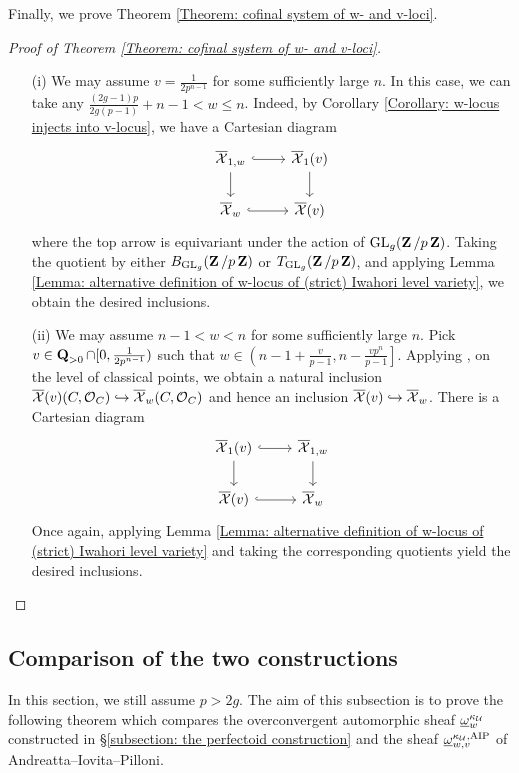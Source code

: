 Finally, we prove Theorem \ref{Theorem: cofinal system of w- and v-loci}.

\begin{proof}[Proof of Theorem \ref{Theorem: cofinal system of w- and v-loci}] 
\begin{enumerate}
    \item[(i)] We may assume $v=\frac{1}{2p^{n-1}}$ for some sufficiently large $n$. In this case, we can take any $\frac{(2g-1)p}{2g(p-1)}+n-1 < w \leq n$. Indeed, by Corollary \ref{Corollary: w-locus injects into v-locus}, we have a Cartesian diagram
     \[
        \begin{tikzcd}
            \overline{\calX}_{1, w}\arrow[r, hook]\arrow[d] & \overline{\calX}_1(v)\arrow[d]\\
        \overline{\calX}_{w}\arrow[r, hook] & \overline{\calX}(v)
        \end{tikzcd}
    \]
    where the top arrow is equivariant under the action of $\operatorname{GL}_g(\operatorname{\mathbf{Z}}/p\operatorname{\mathbf{Z}})$. Taking the quotient by either $B_{\operatorname{GL}_g}(\operatorname{\mathbf{Z}}/p\operatorname{\mathbf{Z}})$ or $T_{\operatorname{GL}_g}(\operatorname{\mathbf{Z}}/p\operatorname{\mathbf{Z}})$, and applying Lemma \ref{Lemma: alternative definition of w-locus of (strict) Iwahori level variety}, we obtain the desired inclusions.
        
    \item[(ii)] We may assume $n-1<w<n$ for some sufficiently large $n$. Pick $v\in \operatorname{\mathbf{Q}}_{>0}\cap [0, \frac{1}{2p^{n-1}})$ such that $w\in \left(n-1+\frac{v}{p-1}, n-\frac{vp^n}{p-1}\right]$. Applying \cite[Proposition 3.2.1]{AIP-2015}, on the level of classical points, we obtain a natural inclusion $\overline{\operatorname{\mathcal{X}}}(v)(C, \operatorname{\mathcal{O}}_C) \hookrightarrow \overline{\operatorname{\mathcal{X}}}_w(C,\operatorname{\mathcal{O}}_C)$ and hence an inclusion $\overline{\operatorname{\mathcal{X}}}(v)\hookrightarrow \overline{\operatorname{\mathcal{X}}}_w$. There is a Cartesian diagram
\[
        \begin{tikzcd}
            \overline{\calX}_1(v)\arrow[r, hook]\arrow[d] & \overline{\calX}_{1, w}\arrow[d]\\
            \overline{\calX}(v)\arrow[r, hook] & \overline{\calX}_w
        \end{tikzcd}
    \] 
    Once again, applying Lemma \ref{Lemma: alternative definition of w-locus of (strict) Iwahori level variety} and taking the corresponding quotients yield the desired inclusions.
\end{enumerate}
\end{proof}


\subsection{Comparison of the two constructions}\label{subsection:comparison sheaf aip} 
In this section, we still assume $p>2g$. The aim of this subsection is to prove the following theorem which compares the overconvergent automorphic sheaf $\underline{\omega}_w^{\kappa_{\operatorname{\mathcal{U}}}}$ constructed in \S \ref{subsection: the perfectoid construction} and the sheaf $\underline{\omega}_{w, v}^{\kappa_{\operatorname{\mathcal{U}}}, \operatorname{AIP}}$ of Andreatta--Iovita--Pilloni.

